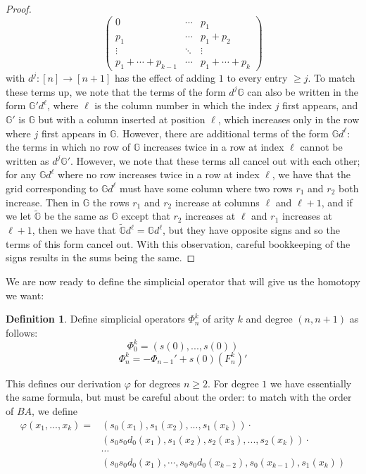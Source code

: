 \documentclass[12pt]{article}
\theoremstyle{definition}
\newtheorem{definition}[theorem]{Definition}
\renewcommand{\phi}{\varphi}
\begin{document}
\begin{proof}
$$\begin{pmatrix}
			0 & \cdots & p_1 \\
			p_1 & \cdots & p_1 + p_2 \\
			\vdots & \ddots & \vdots \\
			p_1 + \cdots + p_{k-1} & \cdots & p_1 + \cdots + p_k
		\end{pmatrix}
	$$
	with $d^j: [n] \to [n+1]$ has the effect of adding $1$ to every entry $\ge j$. To match these terms up, we note that the terms of the form $d^j \mathbb{G}$ can also be written in the form $\mathbb{G}' d^\ell$, where $\ell$ is the column number in which the index $j$ first appears, and $\mathbb{G}'$ is $\mathbb{G}$ but with a column inserted at position $\ell$, which increases only in the row where $j$ first appears in $\mathbb{G}$. 
	However, there are additional terms of the form $\mathbb{G} d^\ell$: the terms in which no row of $\mathbb{G}$ increases twice in a row at index $\ell$ cannot be written as $d^j \mathbb{G}'$. 
	However, we note that these terms all cancel out with each other; for any $\mathbb{G} d^\ell$ where no row increases twice in a row at index $\ell$, we have that the grid corresponding to $\mathbb{G} d^\ell$ must have some column where two rows $r_1$ and $r_2$ both increase. 
	Then in $\mathbb{G}$ the rows $r_1$ and $r_2$ increase at columns $\ell$ and $\ell + 1$, and if we let $\tilde{\mathbb{G}}$ be the same as $\mathbb{G}$ except that $r_2$ increases at $\ell$ and $r_1$ increases at $\ell + 1$, then we have that $\tilde{\mathbb{G}}d^\ell = \mathbb{G} d^\ell$, but they have opposite signs and so the terms of this form cancel out. With this observation, careful bookkeeping of the signs results in the sums being the same.
\end{proof}
We are now ready to define the simplicial operator that will give us the homotopy we want:
\begin{definition}
	Define simplicial operators $\Phi^k_n$ of arity $k$ and degree $(n,n+1)$ as follows:
	$$\Phi_0 ^k= (s(0),...,s(0))$$
	$$\Phi_n^k = -\Phi_{n-1}' + s(0)(F_n^k)'$$
\end{definition}
	This defines our derivation $\phi$ for degrees $n \ge 2$. For degree $1$ we have essentially the same formula, but must be careful about the order: to match with the order of $BA$, we define 
	\begin{align*}
		\phi(x_1,...,x_k) =  &(s_0(x_1),s_1(x_2),...,s_1(x_k)) \cdot \\
							 &(s_0s_0d_0(x_1),s_1(x_2),s_2(x_3),...,s_2(x_k)) \cdot \\
							 &\cdots \\
							 &(s_0s_0d_0 (x_1), \cdots ,s_0s_0d_0(x_{k-2}), s_0(x_{k-1}), s_1(x_k))
	\end{align*}
\end{document}
